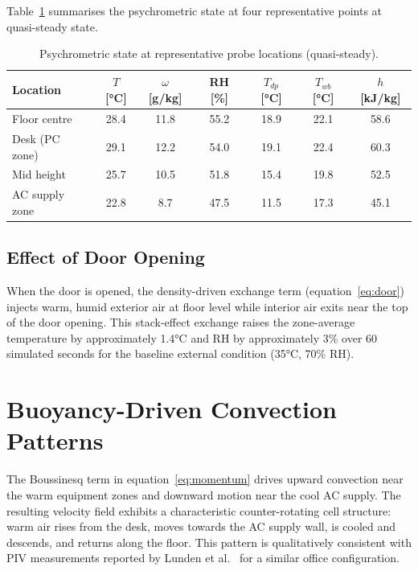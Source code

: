 \documentclass[12pt,a4paper]{report}
\begin{document}
Table~\ref{tab:psychro} summarises the psychrometric state at four representative points at quasi-steady state.

\begin{table}[H]
\centering
\caption{Psychrometric state at representative probe locations (quasi-steady).}
\label{tab:psychro}
\renewcommand{\arraystretch}{1.3}
\begin{tabular}{lcccccc}
\toprule
\textbf{Location} & $T$ [°C] & $\omega$ [g/kg] & RH [\%] & $T_{dp}$ [°C] & $T_{wb}$ [°C] & $h$ [kJ/kg]\\
\midrule
Floor centre   & 28.4 & 11.8 & 55.2 & 18.9 & 22.1 & 58.6\\
Desk (PC zone) & 29.1 & 12.2 & 54.0 & 19.1 & 22.4 & 60.3\\
Mid height     & 25.7 & 10.5 & 51.8 & 15.4 & 19.8 & 52.5\\
AC supply zone & 22.8 & 8.7  & 47.5 & 11.5 & 17.3 & 45.1\\
\bottomrule
\end{tabular}
\end{table}

\subsection{Effect of Door Opening}
\label{subsec:door}

When the door is opened, the density-driven exchange term (equation~\ref{eq:door}) injects warm, humid exterior air at floor level while interior air exits near the top of the door opening. This stack-effect exchange raises the zone-average temperature by approximately 1.4°C and RH by approximately 3\% over 60 simulated seconds for the baseline external condition (35°C, 70\% RH).

\section{Buoyancy-Driven Convection Patterns}
\label{sec:buoyancy}

The Boussinesq term in equation~\eqref{eq:momentum} drives upward convection near the warm equipment zones and downward motion near the cool AC supply. The resulting velocity field exhibits a characteristic counter-rotating cell structure: warm air rises from the desk, moves towards the AC supply wall, is cooled and descends, and returns along the floor. This pattern is qualitatively consistent with PIV measurements reported by Lunden et al.\ \cite{lunden2010} for a similar office configuration.
\end{document}
